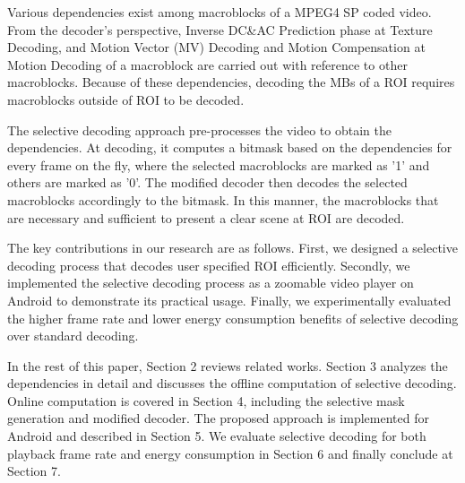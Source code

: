 Various dependencies exist among macroblocks of a MPEG4 SP coded video. From the decoder's perspective, Inverse DC\&AC Prediction phase at Texture Decoding, and Motion Vector (MV) Decoding and Motion Compensation at Motion Decoding of a macroblock are carried out with reference to other macroblocks. Because of these dependencies, decoding the MBs of a ROI requires macroblocks outside of ROI to be decoded. 

The selective decoding approach pre-processes the video to obtain the dependencies. At decoding, it computes a bitmask based on the dependencies for every frame on the fly, where the selected macroblocks are marked as '1' and others are marked as '0'. The modified decoder then decodes the selected macroblocks accordingly to the bitmask. In this manner, the macroblocks that are necessary and sufficient to present a clear scene at ROI are decoded.

The key contributions in our research are as follows. First, we designed a selective decoding process that decodes user specified ROI efficiently. Secondly, we implemented the selective decoding process as a zoomable video player on Android to demonstrate its practical usage. Finally, we experimentally evaluated the higher frame rate and lower energy consumption benefits of selective decoding over standard decoding. 

In the rest of this paper, Section 2 reviews related works. Section 3 analyzes the dependencies in detail and discusses the offline computation of selective decoding. Online computation is covered in Section 4, including the selective mask generation and modified decoder. The proposed approach is implemented for Android and described in Section 5. We evaluate selective decoding for both playback frame rate and energy consumption in Section 6 and finally conclude at Section 7. 





  


  
